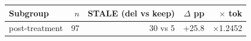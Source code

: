 \begin{tabular}{lrrrr}
\toprule
Subgroup & $n$ & STALE (del vs keep) & $\Delta$ pp & $\times$ tok \\
\midrule
post-treatment & 97 & 30 vs 5 & +25.8 & $\times$1.2452 \\
\bottomrule
\end{tabular}
